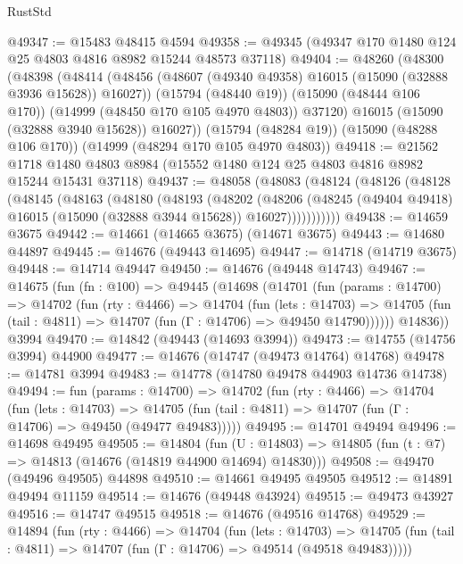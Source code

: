 \begin{lexlean}{RustStd}
\begin{coremodule}
@49347 := @15483 @48415 @4594
@49358 := @49345 (@49347 @170 @1480 @124 @25 @4803 @4816 @8982 @15244 @48573 @37118)
@49404 := @48260
    (@48300
      (@48398
        (@48414
          (@48456 (@48607 (@49340 @49358) @16015 (@15090 (@32888 @3936 @15628)) @16027))
          (@15794 (@48440 @19))
          (@15090 (@48444 @106 @170))
          (@14999 (@48450 @170 @105 @4970 @4803))
          @37120)
        @16015
        (@15090 (@32888 @3940 @15628))
        @16027))
    (@15794 (@48284 @19))
    (@15090 (@48288 @106 @170))
    (@14999 (@48294 @170 @105 @4970 @4803))
@49418 := @21562
    @1718
    @1480
    @4803
    @8984
    (@15552 @1480 @124 @25 @4803 @4816 @8982 @15244 @15431 @37118)
@49437 := @48058
    (@48083
      (@48124
        (@48126
          (@48128
            (@48145
              (@48163
                (@48180
                  (@48193
                    (@48202
                      (@48206
                        (@48245
                          (@49404 @49418)
                          @16015
                          (@15090 (@32888 @3944 @15628))
                          @16027)))))))))))
@49438 := @14659 @3675
@49442 := @14661 (@14665 @3675) (@14671 @3675)
@49443 := @14680 @44897
@49445 := @14676 (@49443 @14695)
@49447 := @14718 (@14719 @3675)
@49448 := @14714 @49447
@49450 := @14676 (@49448 @14743)
@49467 := @14675
    (fun (fn : @100) =>
    @49445
      (@14698
        (@14701
          (fun (params : @14700) =>
          @14702
            (fun (rty : @4466) =>
            @14704
              (fun (lets : @14703) =>
              @14705 (fun (tail : @4811) => @14707 (fun (Γ : @14706) => @49450 @14790))))))
        @14836))
    @3994
@49470 := @14842 (@49443 (@14693 @3994))
@49473 := @14755 (@14756 @3994) @44900
@49477 := @14676 (@14747 (@49473 @14764) @14768)
@49478 := @14781 @3994
@49483 := @14778 (@14780 @49478 @44903 @14736 @14738)
@49494 := fun (params : @14700) =>
  @14702
    (fun (rty : @4466) =>
    @14704
      (fun (lets : @14703) =>
      @14705 (fun (tail : @4811) => @14707 (fun (Γ : @14706) => @49450 (@49477 @49483)))))
@49495 := @14701 @49494
@49496 := @14698 @49495
@49505 := @14804
    (fun (U : @14803) => @14805 (fun (t : @7) => @14813 (@14676 (@14819 @44900 @14694) @14830)))
@49508 := @49470 (@49496 @49505) @44898
@49510 := @14661 @49495 @49505
@49512 := @14891 @49494 @11159
@49514 := @14676 (@49448 @43924)
@49515 := @49473 @43927
@49516 := @14747 @49515
@49518 := @14676 (@49516 @14768)
@49529 := @14894
    (fun (rty : @4466) =>
    @14704
      (fun (lets : @14703) =>
      @14705 (fun (tail : @4811) => @14707 (fun (Γ : @14706) => @49514 (@49518 @49483)))))

\end{coremodule}
\end{lexlean}
